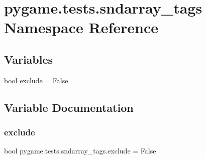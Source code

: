 \hypertarget{namespacepygame_1_1tests_1_1sndarray__tags}{}\section{pygame.\+tests.\+sndarray\+\_\+tags Namespace Reference}
\label{namespacepygame_1_1tests_1_1sndarray__tags}
\subsection*{Variables}
\begin{DoxyCompactItemize}
\item 
bool \hyperlink{namespacepygame_1_1tests_1_1sndarray__tags_a406d348e2842f4b59b2eba5043bf0769}{exclude} = False
\end{DoxyCompactItemize}


\subsection{Variable Documentation}
\mbox{\label{namespacepygame_1_1tests_1_1sndarray__tags_a406d348e2842f4b59b2eba5043bf0769}} 
\subsubsection{\texorpdfstring{exclude}{exclude}}
{\footnotesize\ttfamily bool pygame.\+tests.\+sndarray\+\_\+tags.\+exclude = False}

